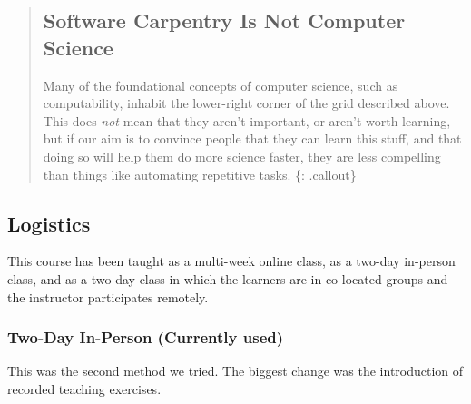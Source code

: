 \begin{quote}
\subsection{Software Carpentry Is Not Computer
Science}\label{software-carpentry-is-not-computer-science}

Many of the foundational concepts of computer science, such as
computability, inhabit the lower-right corner of the grid described
above. This does \emph{not} mean that they aren't important, or aren't
worth learning, but if our aim is to convince people that they can learn
this stuff, and that doing so will help them do more science faster,
they are less compelling than things like automating repetitive tasks.
\{: .callout\}
\end{quote}

\subsection{Logistics}\label{logistics}

This course has been taught as a multi-week online class, as a two-day
in-person class, and as a two-day class in which the learners are in
co-located groups and the instructor participates remotely.

\subsubsection{Two-Day In-Person (Currently
used)}\label{two-day-in-person-currently-used}

This was the second method we tried. The biggest change was the
introduction of recorded teaching exercises.

